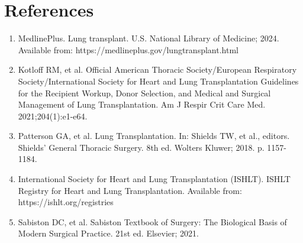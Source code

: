 \section*{References}
\begin{enumerate}
  \item MedlinePlus. Lung transplant. U.S. National Library of Medicine; 2024. Available from: https://medlineplus.gov/lungtransplant.html
  \item Kotloff RM, et al. Official American Thoracic Society/European Respiratory Society/International Society for Heart and Lung Transplantation Guidelines for the Recipient Workup, Donor Selection, and Medical and Surgical Management of Lung Transplantation. Am J Respir Crit Care Med. 2021;204(1):e1-e64.
  \item Patterson GA, et al. Lung Transplantation. In: Shields TW, et al., editors. Shields' General Thoracic Surgery. 8th ed. Wolters Kluwer; 2018. p. 1157-1184.
  \item International Society for Heart and Lung Transplantation (ISHLT). ISHLT Registry for Heart and Lung Transplantation. Available from: https://ishlt.org/registries
  \item Sabiston DC, et al. Sabiston Textbook of Surgery: The Biological Basis of Modern Surgical Practice. 21st ed. Elsevier; 2021.
\end{enumerate}

\clearpage
